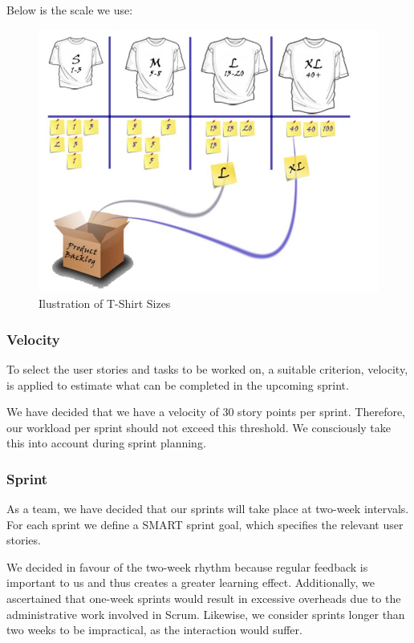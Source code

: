 Below is the scale we use:
\begin{figure}[h!]
    \centering
    \includegraphics[width=1\textwidth]{pictures/tshirt_sizes}
    \caption{Ilustration of T-Shirt Sizes}
    \label{fig:tshirt_sizes}
\end{figure}
\clearpage

\subsubsection{Velocity}
To select the user stories and tasks to be worked on, a suitable criterion, velocity, is applied to estimate what can be completed in the upcoming sprint.

We have decided that we have a velocity of 30 story points per sprint.
Therefore, our workload per sprint should not exceed this threshold. We consciously take this into account during sprint planning.

\subsubsection{Sprint}
As a team, we have decided that our sprints will take place at two-week intervals. For each sprint we define a SMART sprint goal, which specifies the relevant user stories.

We decided in favour of the two-week rhythm because regular feedback is important to us and thus creates a greater learning effect. Additionally, we ascertained that one-week sprints would result in excessive overheads due to the administrative work involved in Scrum. Likewise, we consider sprints longer than two weeks to be impractical, as the interaction would suffer.

